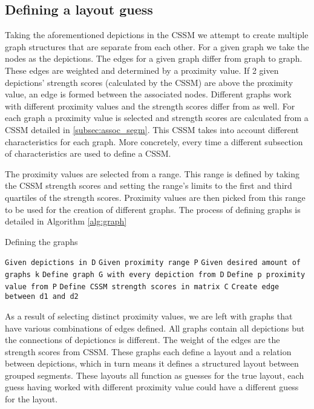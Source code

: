 \subsection{Defining a layout guess} %

Taking the aforementioned depictions in the CSSM we attempt to create multiple graph structures that are separate from each other. For a given graph we take the nodes as the depictions. The edges for a given graph differ from graph to graph. These edges are weighted and  determined by a proximity value. If 2 given depictions' strength scores (calculated by the CSSM) are above the proximity value, an edge is formed between the associated nodes. Different graphs work with different proximity values and the strength scores differ from as well. For each graph a proximity value is selected and strength scores are calculated from a CSSM detailed in \ref{subsec:assoc_segm}. This CSSM takes into account different characteristics for each graph. More concretely, every time a different subsection of characteristics are used to define a CSSM. 

The proximity values are selected from a range. This range is defined by taking the CSSM strength scores and setting the range's limits to the first and third quartiles of the strength scores. Proximity values are then picked from this range to be used for the creation of different graphs. The process of defining graphs is detailed in Algorithm \ref{alg:graph}

\begin{algorithm}
\caption{Defining the graphs}\label{alg:graph}
\begin{algorithmic}
\State \texttt{Given depictions in D}
\State \texttt{Given proximity range P}
\State \texttt{Given desired amount of graphs k}
\State \texttt{Define graph G with every depiction from D}
    \State \texttt{Define p proximity value from P}
    \State \texttt{Define CSSM strength scores in matrix C}
                \State \texttt{Create edge between d1 and d2}
            \EndIf
        \EndFor
    \EndFor
\EndFor

\end{algorithmic}
\end{algorithm}



As a result of selecting distinct proximity values, we are left with graphs that have various combinations of edges defined. All graphs contain all depictions but the connections of depictioncs is different. The weight of the edges are the strength scores from CSSM. These graphs each define a layout and a relation between depictions, which in turn means it defines a structured layout between grouped segments. These layouts all function as guesses for the true layout, each guess having worked with different proximity value could have a different guess for the layout.

